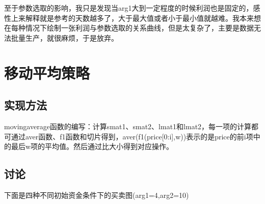 \documentclass{ctexart}
\begin{document}
	至于参数选取的影响，我只是发现当arg1大到一定程度的时候利润也是固定的，感性上来解释就是参考的天数越多了，大于最大值或者小于最小值就越难。我本来想在每种情况下绘制一张利润与参数选取的关系曲线，但是太复杂了，主要是数据无法批量生产，就很麻烦，于是放弃。
	\section{移动平均策略}
	\subsection{实现方法}
	movingaverage函数的编写：计算smat1、smat2、lmat1和lmat2，每一项的计算都可通过aver函数、f1函数和切片得到，aver(f1(price[0:i],w))表示的是price的前i项中的最后w项的平均值。然后通过比大小得到对应操作。
	\subsection{讨论}
	下面是四种不同初始资金条件下的买卖图(arg1=4,arg2=10)
	\begin{figure}[H]
		\centering
	\end{figure}
	\begin{figure}[H]
		\centering
	\end{figure}
	\begin{figure}[H]
		\centering
	\end{figure}
\end{document}
